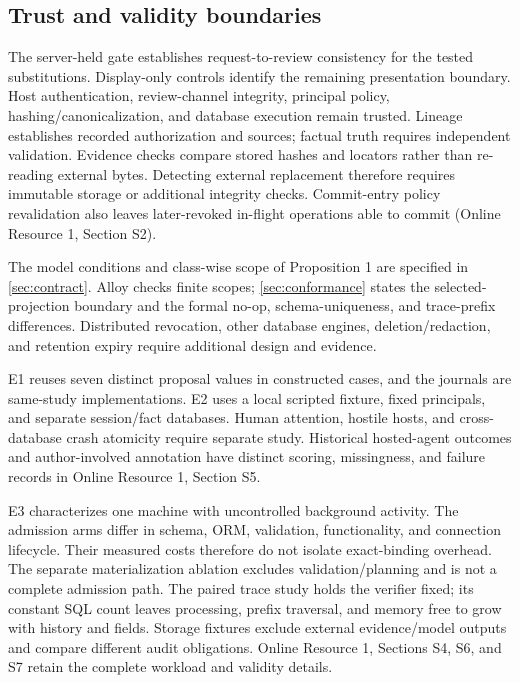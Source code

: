 \subsection{Trust and validity boundaries}

The server-held gate establishes request-to-review consistency for the tested substitutions. Display-only controls identify the remaining presentation boundary. Host authentication, review-channel integrity, principal policy, hashing/canonicalization, and database execution remain trusted. Lineage establishes recorded authorization and sources; factual truth requires independent validation. Evidence checks compare stored hashes and locators rather than re-reading external bytes. Detecting external replacement therefore requires immutable storage or additional integrity checks. Commit-entry policy revalidation also leaves later-revoked in-flight operations able to commit (Online Resource 1, Section S2).

The model conditions and class-wise scope of Proposition 1 are specified in \cref{sec:contract}. Alloy checks finite scopes; \cref{sec:conformance} states the selected-projection boundary and the formal no-op, schema-uniqueness, and trace-prefix differences. Distributed revocation, other database engines, deletion/redaction, and retention expiry require additional design and evidence.

E1 reuses seven distinct proposal values in constructed cases, and the journals are same-study implementations. E2 uses a local scripted fixture, fixed principals, and separate session/fact databases. Human attention, hostile hosts, and cross-database crash atomicity require separate study. Historical hosted-agent outcomes and author-involved annotation have distinct scoring, missingness, and failure records in Online Resource 1, Section S5.

E3 characterizes one machine with uncontrolled background activity. The admission arms differ in schema, ORM, validation, functionality, and connection lifecycle. Their measured costs therefore do not isolate exact-binding overhead. The separate materialization ablation excludes validation/planning and is not a complete admission path. The paired trace study holds the verifier fixed; its constant SQL count leaves processing, prefix traversal, and memory free to grow with history and fields. Storage fixtures exclude external evidence/model outputs and compare different audit obligations. Online Resource 1, Sections S4, S6, and S7 retain the complete workload and validity details.

